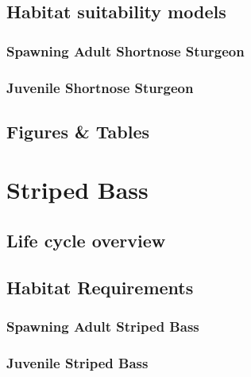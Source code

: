 \documentclass[
]{book}
\begin{document}
\hypertarget{habitat-suitability-models-8}{%
\section{Habitat suitability models}\label{habitat-suitability-models-8}}

\hypertarget{spawning-adult-shortnose-sturgeon-1}{%
\subsection{Spawning Adult Shortnose Sturgeon}\label{spawning-adult-shortnose-sturgeon-1}}

\hypertarget{juvenile-shortnose-sturgeon-1}{%
\subsection{Juvenile Shortnose Sturgeon}\label{juvenile-shortnose-sturgeon-1}}

\hypertarget{figures-tables-8}{%
\section{Figures \& Tables}\label{figures-tables-8}}

\hypertarget{striped-bass}{%
\chapter{Striped Bass}\label{striped-bass}}

\hypertarget{life-cycle-overview-9}{%
\section{Life cycle overview}\label{life-cycle-overview-9}}

\hypertarget{habitat-requirements-9}{%
\section{Habitat Requirements}\label{habitat-requirements-9}}

\hypertarget{spawning-adult-striped-bass}{%
\subsection{Spawning Adult Striped Bass}\label{spawning-adult-striped-bass}}

\hypertarget{juvenile-striped-bass}{%
\subsection{Juvenile Striped Bass}\label{juvenile-striped-bass}}
\end{document}
